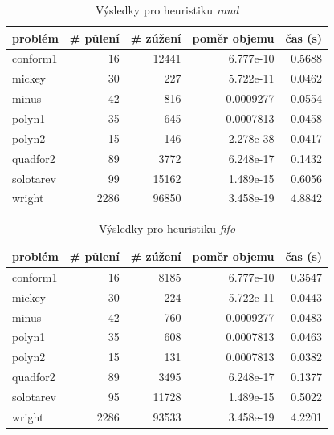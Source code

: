 {\begin{table}[H]
\centering
\begin{tabular}{lrrrr}
\hline
problém & \# půlení & \# zúžení & poměr objemu & čas (s) \\ \hline
conform1 & 16 & 12441 & 6.777e-10 & 0.5688 \\
mickey & 30 & 227 & 5.722e-11 & 0.0462 \\
minus & 42 & 816 & 0.0009277 & 0.0554 \\
polyn1 & 35 & 645 & 0.0007813 & 0.0458 \\
polyn2 & 15 & 146 & 2.278e-38 & 0.0417 \\
quadfor2 & 89 & 3772 & 6.248e-17 & 0.1432 \\
solotarev & 99 & 15162 & 1.489e-15 & 0.6056 \\
wright & 2286 & 96850 & 3.458e-19 & 4.8842 \\
\end{tabular}
\caption{Výsledky pro heuristiku \emph{rand}}
\label{rand}
\end{table}



\begin{table}[H]
\centering
\begin{tabular}{lrrrr}
\hline
problém & \# půlení & \# zúžení & poměr objemu & čas (s) \\ \hline
conform1 & 16 & 8185 & 6.777e-10 & 0.3547 \\
mickey & 30 & 224 & 5.722e-11 & 0.0443 \\
minus & 42 & 760 & 0.0009277 & 0.0483 \\
polyn1 & 35 & 608 & 0.0007813 & 0.0463 \\
polyn2 & 15 & 131 & 0.0007813 & 0.0382 \\
quadfor2 & 89 & 3495 & 6.248e-17 & 0.1377 \\
solotarev & 95 & 11728 & 1.489e-15 & 0.5022 \\
wright & 2286 & 93533 & 3.458e-19 & 4.2201 \\
\end{tabular}
\caption{Výsledky pro heuristiku \emph{fifo}}
\label{fifo}
\end{table}



}
